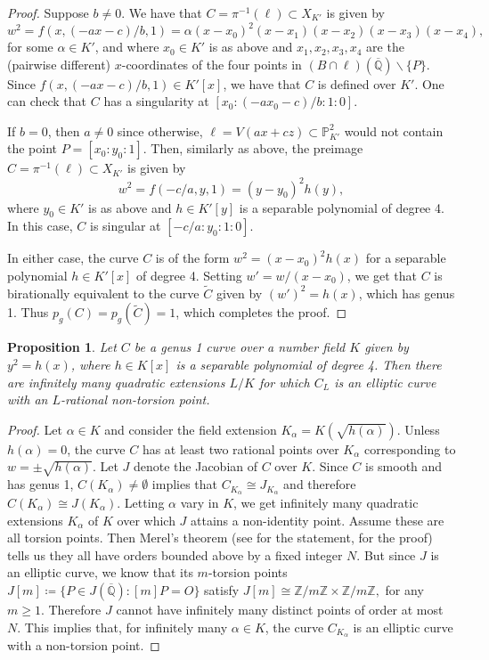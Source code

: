 \documentclass[11pt]{amsart}
\newcommand{\QQ}{\mathbb{Q}}
\newcommand{\ZZ}{\mathbb{Z}}
\newcommand{\PP}{\mathbb{P}}
\theoremstyle{plain}
\newtheorem{proposition}[lemma]{Proposition}
\theoremstyle{remark}
\begin{document}
\begin{proof}
Suppose $b\neq 0$. We have that $C=\pi^{-1}(\ell)\subset X_{K'}$ is given by
\[
w^2=f(x,(-ax-c)/b,1)=\alpha (x-x_0)^2(x-x_1)(x-x_2)(x-x_3)(x-x_4),
\]
for some $\alpha\in K'$, and where $x_0\in K'$ is as above and $x_1,x_2,x_3,x_4$ are the (pairwise different) $x$-coordinates of the four points in $(B\cap \ell)(\overline{\QQ})\backslash \{P\}$. Since $f(x,(-ax-c)/b,1)\in K'[x]$, we have that $C$ is defined over $K'$. One can check that $C$ has a singularity at $[x_0:(-ax_0-c)/b:1:0]$. 

If $b=0$, then $a\neq 0$ since otherwise, $\ell=V(ax+cz)\subset \PP^2_{K'}$ would not contain the point $P=[x_0\colon y_0\colon 1]$. Then, similarly as above, the preimage $C=\pi^{-1}(\ell)\subset X_{K'}$ is given by 
\[
w^2=f(-c/a, y, 1)=(y-y_0)^2h(y),
\]
where $y_0\in K'$ is as above and $h\in K'[y]$ is a separable polynomial of degree 4. In this case, $C$ is singular at $[-c/a:y_0:1:0]$.

In either case, the curve $C$ is of the form $w^2=(x-x_0)^2h(x)$ for a separable polynomial $h\in K'[x]$ of degree 4. Setting $w'=w/(x-x_0)$, we get that $C$ is birationally equivalent to the curve $\widetilde{C}$ given by $(w')^2=h(x)$, which has genus 1. Thus $p_g(C)=p_g(\widetilde{C})=1$, which completes the proof. 
\end{proof}

\begin{proposition} \label{quadraticext}
    Let $C$ be a genus 1 curve over a number field $K$ given by $y^2=h(x)$, where $h\in K[x]$ is a separable polynomial of degree 4. Then there are infinitely many quadratic extensions $L/K$ for which $C_L$ is an elliptic curve with an $L$-rational non-torsion point. 
\end{proposition}
\begin{proof}
    Let $\alpha\in K$ and consider the field extension $K_\alpha=K(\sqrt{h(\alpha)})$. Unless $h(\alpha)=0$, 
the curve $C$ has at least two rational points over $K_\alpha$ corresponding to $w=\pm \sqrt{h(\alpha)}$. 
Let $J$ denote the Jacobian of $C$ over $K$. Since $C$ is smooth and has genus 1, $C(K_\alpha)\neq \emptyset$ implies that $C_{K_\alpha}\cong J_{K_\alpha}$ and therefore $C(K_\alpha)\cong J(K_\alpha)$. 
Letting $\alpha$ vary in $K$, we get infinitely many quadratic extensions $K_{\alpha}$ of $K$ over which $J$ attains a non-identity point. Assume these are all torsion points. Then Merel's theorem (see \cite[p.~242]{AEC} for the statement, \cite{Merel} for the proof) tells us they all have orders bounded above by a fixed integer $N$. But since $J$ is an elliptic curve, we know that its $m$-torsion points $J[m]\coloneqq \{P\in J(\overline{\QQ}) \colon [m]P=O\}$ satisfy \(J[m]\cong \ZZ/m\ZZ \times \ZZ/m\ZZ,\) for any $m\geq 1$. Therefore $J$ cannot have infinitely many distinct points of order at most $N$. 
This implies that, for infinitely many $\alpha\in K$, the curve $C_{K_{\alpha}}$ is an elliptic curve with a non-torsion point. 
\end{proof}
\end{document}

